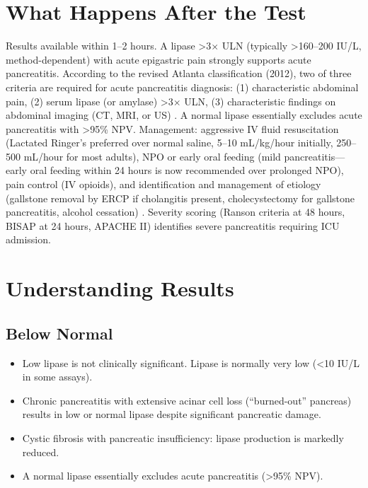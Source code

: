 \section*{What Happens After the Test}
Results available within 1--2 hours. A lipase >3$\times$ ULN (typically >160--200 IU/L, method-dependent) with acute epigastric pain strongly supports acute pancreatitis. According to the revised Atlanta classification (2012), two of three criteria are required for acute pancreatitis diagnosis: (1) characteristic abdominal pain, (2) serum lipase (or amylase) >3$\times$ ULN, (3) characteristic findings on abdominal imaging (CT, MRI, or US) \cite{banks2013classification}. A normal lipase essentially excludes acute pancreatitis with >95\% NPV. Management: aggressive IV fluid resuscitation (Lactated Ringer's preferred over normal saline, 5--10 mL/kg/hour initially, 250--500 mL/hour for most adults), NPO or early oral feeding (mild pancreatitis---early oral feeding within 24 hours is now recommended over prolonged NPO), pain control (IV opioids), and identification and management of etiology (gallstone removal by ERCP if cholangitis present, cholecystectomy for gallstone pancreatitis, alcohol cessation) \cite{tierney2023current}. Severity scoring (Ranson criteria at 48 hours, BISAP at 24 hours, APACHE II) identifies severe pancreatitis requiring ICU admission.

\section*{Understanding Results}

\subsection*{Below Normal}
\begin{itemize}
  \item Low lipase is not clinically significant. Lipase is normally very low (<10 IU/L in some assays).
  \item Chronic pancreatitis with extensive acinar cell loss (``burned-out'' pancreas) results in low or normal lipase despite significant pancreatic damage.
  \item Cystic fibrosis with pancreatic insufficiency: lipase production is markedly reduced.
  \item A normal lipase essentially excludes acute pancreatitis (>95\% NPV).
\end{itemize}

